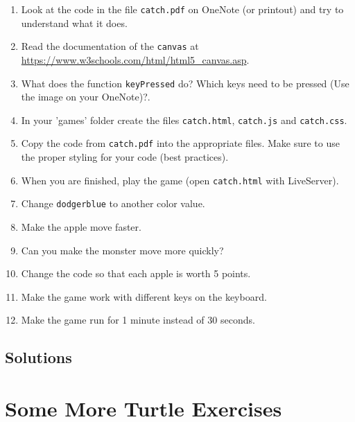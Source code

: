\documentclass[11pt,a4paper]{report}
\begin{document}
\begin{ex}
\begin{enumerate}
\item Look at the code in the file \verb|catch.pdf| on OneNote (or printout) and try to understand what it does.
\item Read the documentation of the \verb|canvas| at \url{https://www.w3schools.com/html/html5_canvas.asp}.
\item What does the function \verb|keyPressed| do? Which keys need to be pressed (Use the image on your OneNote)?.
\item In your 'games' folder create the files \verb|catch.html|, \verb|catch.js| and \verb|catch.css|.
\item Copy the code from \verb|catch.pdf| into the appropriate files. Make sure to use  the proper styling for your code (best practices). 
\item When you are finished, play the game (open \verb|catch.html| with LiveServer).
\item Change \verb|dodgerblue| to another color value.
\item Make the apple move faster.
\item Can you make the monster move more quickly?
\item Change the code so that each apple is worth 5 points.
\item Make the game work with different keys on the keyboard.
\item Make the game run for 1 minute instead of 30 seconds.
\end{enumerate}
\end{ex}


\newpage

\subsection*{Solutions}
\printcursols
\newpage
\section{Some More Turtle Exercises}
\end{document}
